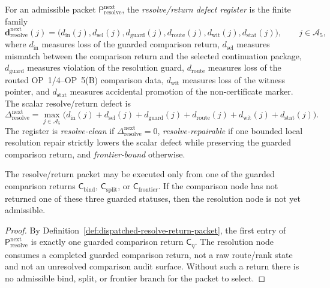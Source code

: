 \begin{definition}
\label{def:resolve-return-defect-register}
For an admissible packet \(\mathsf P_{\mathrm{resolve}}^{\mathrm{next}}\), the \emph{resolve/return defect register} is the finite family
\[
 \mathbf d_{\mathrm{resolve}}^{\mathrm{next}}(j)
 =
 \bigl(d_{\mathrm{in}}(j),d_{\mathrm{sel}}(j),d_{\mathrm{guard}}(j),
 d_{\mathrm{route}}(j),d_{\mathrm{wit}}(j),d_{\mathrm{stat}}(j)\bigr),
 \qquad j\in\mathcal A_5,
\]
where \(d_{\mathrm{in}}\) measures loss of the guarded comparison return, \(d_{\mathrm{sel}}\) measures mismatch between the comparison return and the selected continuation package, \(d_{\mathrm{guard}}\) measures violation of the resolution guard, \(d_{\mathrm{route}}\) measures loss of the routed OP~1/4--OP~5(B) comparison data, \(d_{\mathrm{wit}}\) measures loss of the witness pointer, and \(d_{\mathrm{stat}}\) measures accidental promotion of the non-certificate marker. The scalar resolve/return defect is
\[
 \Delta_{\mathrm{resolve}}^{\mathrm{next}}
 =
 \max_{j\in\mathcal A_5}
 \bigl(d_{\mathrm{in}}(j)+d_{\mathrm{sel}}(j)+d_{\mathrm{guard}}(j)+d_{\mathrm{route}}(j)+d_{\mathrm{wit}}(j)+d_{\mathrm{stat}}(j)\bigr).
\]
The register is \emph{resolve-clean} if \(\Delta_{\mathrm{resolve}}^{\mathrm{next}}=0\), \emph{resolve-repairable} if one bounded local resolution repair strictly lowers the scalar defect while preserving the guarded comparison return, and \emph{frontier-bound} otherwise.
\end{definition}

\begin{lemma}
\label{lem:guarded-comparison-return-is-resolve-precondition}
The resolve/return packet may be executed only from one of the guarded comparison returns \(\mathsf C_{\mathrm{bind}}\), \(\mathsf C_{\mathrm{split}}\), or \(\mathsf C_{\mathrm{frontier}}\). If the comparison node has not returned one of these three guarded statuses, then the resolution node is not yet admissible.
\end{lemma}

\begin{proof}
By Definition~\ref{def:dispatched-resolve-return-packet}, the first entry of \(\mathsf P_{\mathrm{resolve}}^{\mathrm{next}}\) is exactly one guarded comparison return \(\mathsf C_{\eta}\). The resolution node consumes a completed guarded comparison return, not a raw route/rank state and not an unresolved comparison audit surface. Without such a return there is no admissible bind, split, or frontier branch for the packet to select.
\end{proof}

